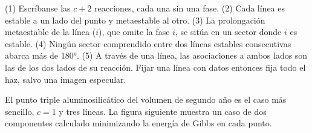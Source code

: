 \begin{method}\label{met:b3:petrological-thermodynamics:schreinemakers}
(1) Escríbanse las $c + 2$ reacciones, cada una sin una fase. (2) Cada línea es
estable a un lado del punto y metaestable al otro. (3) La prolongación
metaestable de la línea ($i$), que omite la fase $i$, se sitúa en
un sector donde $i$ es estable. (4) Ningún sector comprendido entre dos líneas estables consecutivas
abarca más de \ang{180}. (5) A través de una línea, las asociaciones a ambos lados
son las de los dos lados de su reacción. Fijar una línea con datos entonces
fija todo el haz, salvo una imagen especular.
\end{method}

El punto triple aluminosilicático del volumen de segundo año es el caso más sencillo,
$c = 1$ y tres líneas. La figura siguiente muestra un caso de dos componentes
calculado minimizando la energía de Gibbs en cada punto.

